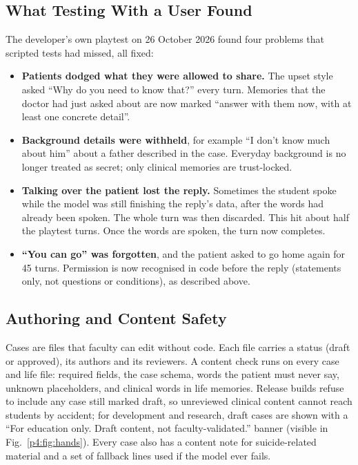 \documentclass[10pt]{article}
\begin{document}
\subsection{What Testing With a User Found}
The developer's own playtest on 26 October 2026 found four problems that scripted tests had missed, all fixed:
\begin{itemize}
\item \textbf{Patients dodged what they were allowed to share.} The upset style asked ``Why do you need to know that?'' every turn. Memories that
the doctor had just asked about are now marked ``answer with them now, with at least one concrete detail''.
\item \textbf{Background details were withheld}, for example ``I don't know much about him'' about a father described in the case. Everyday
background is no longer treated as secret; only clinical memories are trust-locked.
\item \textbf{Talking over the patient lost the reply.} Sometimes the student spoke while the model was still finishing the reply's data, after the words had already been spoken. The whole turn was then discarded. This hit about half the playtest turns. Once the words are spoken, the turn now completes.
\item \textbf{``You can go'' was forgotten}, and the patient asked to go home again for 45 turns. Permission is now recognised in code before the
reply (statements only, not questions or conditions), as described above.
\end{itemize}

\subsection{Authoring and Content Safety}\label{sec:authoring}
Cases are files that faculty can edit without code. Each file carries a status (draft or approved), its authors and its reviewers. A content
check runs on every case and life file: required fields, the case schema, words the patient must never say, unknown placeholders, and clinical
words in life memories. Release builds refuse to include any case still marked draft, so unreviewed clinical content cannot reach students by
accident; for development and research, draft cases are shown with a ``For education only. Draft content, not faculty-validated.'' banner (visible in
Fig.~\ref{p4:fig:hands}). Every case also has a content note for suicide-related material and a set of fallback lines used if the model ever fails.
\end{document}
